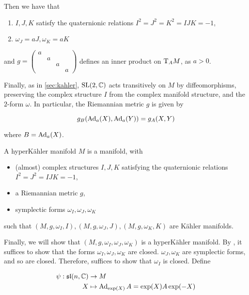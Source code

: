 \documentclass{article}
\renewcommand{\sl}{\mathfrak{sl}}
\begin{document}
Then we have that

\begin{enumerate}
    \item \(I, J, K\) satisfy the quaternionic relations \(I^2 = J^2 = K^2 = IJK = -1\),
    \item \(\omega_J = aJ, \omega_K = aK\)
\end{enumerate}

and \(g = \begin{pmatrix}
    a \\ & a \\
    && a\\
    &&& a
\end{pmatrix}\) defines an inner product on \(\mathrm{T}_AM\), as \(a > 0\). 

Finally, as in \cref{sec:kahler}, \(\operatorname{SL}(2, \mathbb{C})\) acts transitively on \(M\) by diffeomorphisms, preserving the complex structure \(I\) from the complex manifold structure, and the \(2\)-form \(\omega\). In particular, the Riemannian metric \(g\) is given by

\[g_B(\operatorname{Ad}_{a}(X), \operatorname{Ad}_{a}(Y)) = g_A(X, Y)\]

where \(B = \operatorname{Ad}_a(X)\).

\begin{definition}

    A hyperK\"ahler manifold \(M\) is a manifold, with 
    
    \begin{itemize}
        \item (almost) complex structures \(I, J, K\) satisfying the quaternionic relations \(I^2 = J^2 = IJK = -1\), 
        \item a Riemannian metric \(g\),
        \item symplectic forms \(\omega_I, \omega_J, \omega_K\)
    \end{itemize}

    such that \((M, g, \omega_I, I), (M, g, \omega_J, J), (M, g, \omega_K, K)\) are K\"ahler manifolds.
\end{definition}

Finally, we will show that \((M, g, \omega_I, \omega_J, \omega_K)\) is a hyperK\"ahler manifold. By \cite[Page 64]{hitchin_monopoles}, it suffices to show that the forms \(\omega_I, \omega_J, \omega_K\) are closed. \(\omega_J, \omega_K\) are symplectic forms, and so are closed. Therefore, suffices to show that \(\omega_I\) is closed. Define

\begin{align*}
    \psi : \sl(n, \C) &\to M \\
    X &\mapsto \Ad_{\exp(X)}A = \exp(X)A\exp(-X)
\end{align*}
\end{document}
